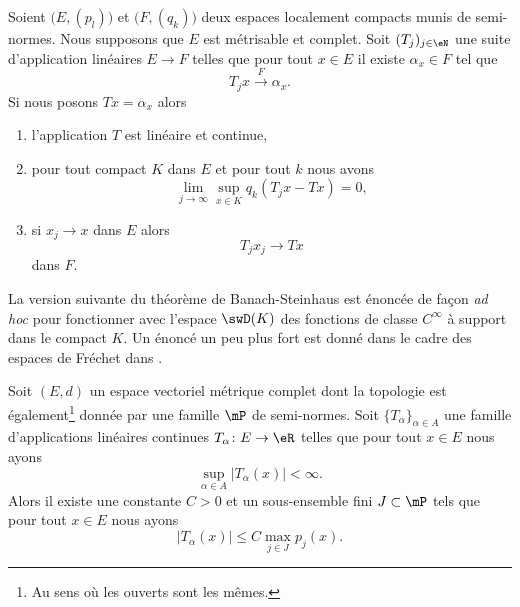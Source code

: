 \begin{corollary}   \label{CorPGwLluz}
    Soient \( \big( E,(p_l) \big)\) et \( \big( F,(q_k) \big)\) deux espaces localement compacts munis de semi-normes. Nous supposons que \( E\) est métrisable et complet. Soit \( (T_j)_{j\in \eN}\) une suite d'application linéaires \( E\to F\) telles que pour tout \( x\in E\) il existe \( \alpha_x\in F\) tel que
    \begin{equation}
        T_jx\stackrel{F}{\longrightarrow}\alpha_x.
    \end{equation}
    Si nous posons \( Tx=\alpha_x\) alors
    \begin{enumerate}
        \item   \label{ItemAEOtOMLi}
            l'application \( T\) est linéaire et continue,
        \item
            pour tout compact \( K\) dans \( E\) et pour tout \( k\) nous avons
            \begin{equation}
                \lim_{j\to \infty} \sup_{x\in K}q_k(T_jx-Tx)=0,
            \end{equation}
        \item   \label{ItemAEOtOMLiii}
            si \( x_j\to x\) dans \( E\) alors
            \begin{equation}
                T_jx_j\to Tx
            \end{equation}
            dans \( F\).
    \end{enumerate}
\end{corollary}

La version suivante du théorème de Banach-Steinhaus est énoncée de façon \emph{ad hoc} pour fonctionner avec l'espace \( \swD(K)\) des fonctions de classe \(  C^{\infty}\) à support dans le compact \( K\). Un énoncé un peu plus fort est donné dans le cadre des espaces de Fréchet dans \cite{TQSWRiz}.
\begin{theorem}  \label{ThoNBrmGIg}
    Soit \( (E,d)\) un espace vectoriel métrique complet dont la topologie est également\footnote{Au sens où les ouverts sont les mêmes.} donnée par une famille \( \mP\) de semi-normes. Soit \( \{ T_{\alpha} \}_{\alpha\in A}\) une famille d'applications linéaires continues \( T_{\alpha}\colon E\to \eR\) telles que pour tout \( x\in E\) nous ayons
    \begin{equation}
        \sup_{\alpha\in A}\big| T_{\alpha}(x) \big|<\infty.
    \end{equation}
    Alors il existe une constante \( C>0\) et un sous-ensemble fini \( J\subset \mP\) tels que pour tout \( x\in E\) nous ayons
    \begin{equation}    \label{EqIFNGhtr}
        \big| T_{\alpha} (x)\big|\leq C\max_{j\in J}p_j(x).
    \end{equation}
\end{theorem}


